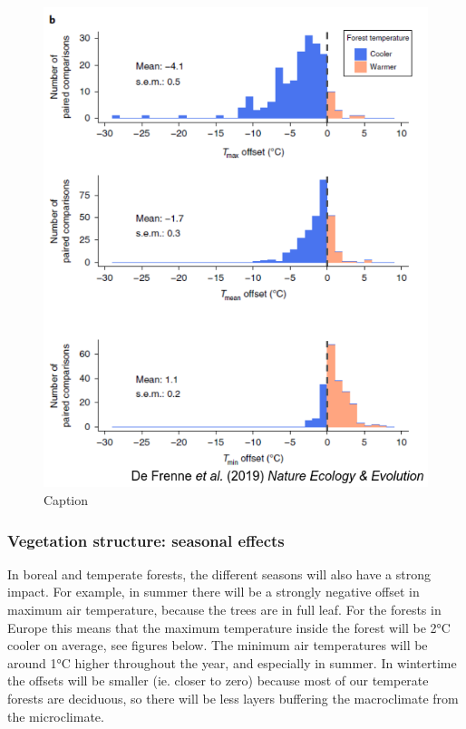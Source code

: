 \documentclass[12pt,oneside]{book}
\begin{document}
\begin{figure}

{\centering \includegraphics[width=0.75\linewidth]{figures/Figure1019} 

}

\caption{Caption}\label{fig:Micro19}
\end{figure}

\subsubsection{Vegetation structure: seasonal
effects}\label{vegetation-structure-seasonal-effects}

In boreal and temperate forests, the different seasons will also have a
strong impact. For example, in summer there will be a strongly negative
offset in maximum air temperature, because the trees are in full leaf.
For the forests in Europe this means that the maximum temperature inside
the forest will be 2°C cooler on average, see figures below. The minimum
air temperatures will be around 1°C higher throughout the year, and
especially in summer. In wintertime the offsets will be smaller (ie.
closer to zero) because most of our temperate forests are deciduous, so
there will be less layers buffering the macroclimate from the
microclimate.
\end{document}
